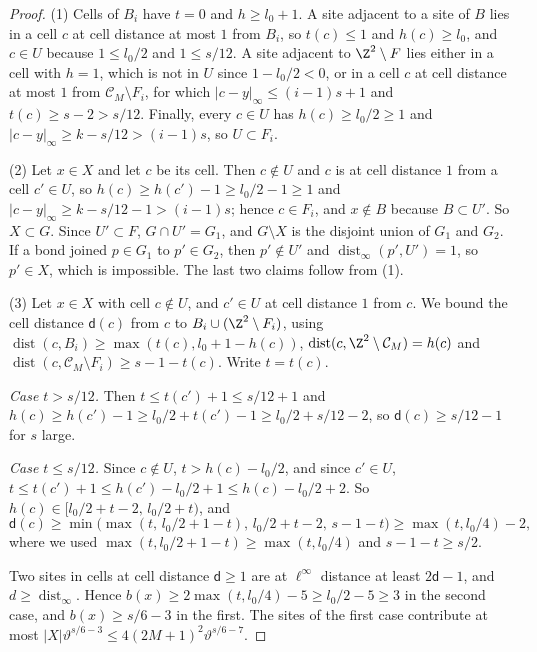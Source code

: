 \begin{proof}
(1) Cells of $B_i$ have $t = 0$ and $h \ge l_0 + 1$. A site adjacent to a site of $B$ lies in a cell $c$ at cell distance at most $1$ from $B_i$, so $t(c) \le 1$ and $h(c) \ge l_0$, and $c \in U$ because $1 \le l_0/2$ and $1 \le s/12$. A site adjacent to $\Z^2 \setminus F$ lies either in a cell with $h = 1$, which is not in $U$ since $1 - l_0/2 < 0$, or in a cell $c$ at cell distance at most $1$ from $\mathcal C_M \setminus F_i$, for which $|c - y|_\infty \le (i - 1)s + 1$ and $t(c) \ge s - 2 > s/12$. Finally, every $c \in U$ has $h(c) \ge l_0/2 \ge 1$ and $|c - y|_\infty \ge k - s/12 > (i - 1) s$, so $U \subset F_i$.

(2) Let $x \in X$ and let $c$ be its cell. Then $c \notin U$ and $c$ is at cell distance $1$ from a cell $c' \in U$, so $h(c) \ge h(c') - 1 \ge l_0/2 - 1 \ge 1$ and $|c - y|_\infty \ge k - s/12 - 1 > (i - 1) s$; hence $c \in F_i$, and $x \notin B$ because $B \subset U'$. So $X \subset G$. Since $U' \subset F$, $G \cap U' = G_1$, and $G \setminus X$ is the disjoint union of $G_1$ and $G_2$. If a bond joined $p \in G_1$ to $p' \in G_2$, then $p' \notin U'$ and $\operatorname{dist}_\infty(p', U') = 1$, so $p' \in X$, which is impossible. The last two claims follow from (1).

(3) Let $x \in X$ with cell $c \notin U$, and $c' \in U$ at cell distance $1$ from $c$. We bound the cell distance $\mathsf d(c)$ from $c$ to $B_i \cup (\Z^2 \setminus F_i)$, using $\operatorname{dist}(c, B_i) \ge \max(t(c), l_0 + 1 - h(c))$, $\operatorname{dist}(c, \Z^2 \setminus \mathcal C_M) = h(c)$ and $\operatorname{dist}(c, \mathcal C_M \setminus F_i) \ge s - 1 - t(c)$. Write $t = t(c)$.

\emph{Case $t > s/12$.} Then $t \le t(c') + 1 \le s/12 + 1$ and $h(c) \ge h(c') - 1 \ge l_0/2 + t(c') - 1 \ge l_0/2 + s/12 - 2$, so $\mathsf d(c) \ge s/12 - 1$ for $s$ large.

\emph{Case $t \le s/12$.} Since $c \notin U$, $t > h(c) - l_0/2$, and since $c' \in U$, $t \le t(c') + 1 \le h(c') - l_0/2 + 1 \le h(c) - l_0/2 + 2$. So $h(c) \in [l_0/2 + t - 2, \, l_0/2 + t)$, and
\begin{equation*}
\mathsf d(c) \ge \min\bigl( \max(t, \, l_0/2 + 1 - t), \, l_0/2 + t - 2, \, s - 1 - t \bigr) \ge \max(t, l_0/4) - 2,
\end{equation*}
where we used $\max(t, l_0/2 + 1 - t) \ge \max(t, l_0/4)$ and $s - 1 - t \ge s/2$.

Two sites in cells at cell distance $\mathsf d \ge 1$ are at $\ell^\infty$ distance at least $2 \mathsf d - 1$, and $d \ge \operatorname{dist}_\infty$. Hence $b(x) \ge 2 \max(t, l_0/4) - 5 \ge l_0/2 - 5 \ge 3$ in the second case, and $b(x) \ge s/6 - 3$ in the first. The sites of the first case contribute at most $|X| \vartheta^{s/6 - 3} \le 4 (2M + 1)^2 \vartheta^{s/6 - 7}$.


\end{proof}
